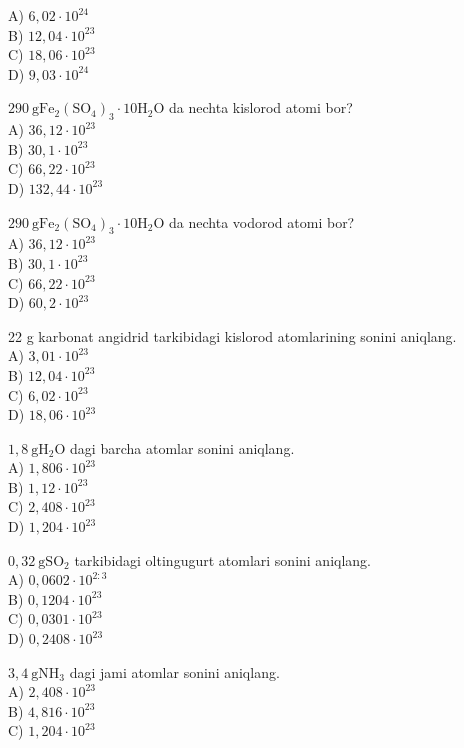A) $6,02 \cdot 10^{24}$\\
B) $12,04 \cdot 10^{23}$\\
C) $18,06 \cdot 10^{23}$\\
D) $9,03 \cdot 10^{24}$
  \item $290 \mathrm{~g} \mathrm{Fe}_{2}\left(\mathrm{SO}_{4}\right)_{3} \cdot 10 \mathrm{H}_{2} \mathrm{O}$ da nechta kislorod atomi bor?\\
A) $36,12 \cdot 10^{23}$\\
B) $30,1 \cdot 10^{23}$\\
C) $66,22 \cdot 10^{23}$\\
D) $132,44 \cdot 10^{23}$
  \item $290 \mathrm{~g} \mathrm{Fe}_{2}\left(\mathrm{SO}_{4}\right)_{3} \cdot 10 \mathrm{H}_{2} \mathrm{O}$ da nechta vodorod atomi bor?\\
A) $36,12 \cdot 10^{23}$\\
B) $30,1 \cdot 10^{23}$\\
C) $66,22 \cdot 10^{23}$\\
D) $60,2 \cdot 10^{23}$
  \item 22 g karbonat angidrid tarkibidagi kislorod atomlarining sonini aniqlang.\\
A) $3,01 \cdot 10^{23}$\\
B) $12,04 \cdot 10^{23}$\\
C) $6,02 \cdot 10^{23}$\\
D) $18,06 \cdot 10^{23}$
  \item $1,8 \mathrm{~g} \mathrm{H}_{2} \mathrm{O}$ dagi barcha atomlar sonini aniqlang.\\
A) $1,806 \cdot 10^{23}$\\
B) $1,12 \cdot 10^{23}$\\
C) $2,408 \cdot 10^{23}$\\
D) $1,204 \cdot 10^{23}$
  \item $0,32 \mathrm{~g} \mathrm{SO}_{2}$ tarkibidagi oltingugurt atomlari sonini aniqlang.\\
A) $0,0602 \cdot 10^{2: 3}$\\
B) $0,1204 \cdot 10^{23}$\\
C) $0,0301 \cdot 10^{23}$\\
D) $0,2408 \cdot 10^{23}$
  \item $3,4 \mathrm{~g} \mathrm{NH}_{3}$ dagi jami atomlar sonini aniqlang.\\
A) $2,408 \cdot 10^{23}$\\
B) $4,816 \cdot 10^{23}$\\
C) $1,204 \cdot 10^{23}$\\
